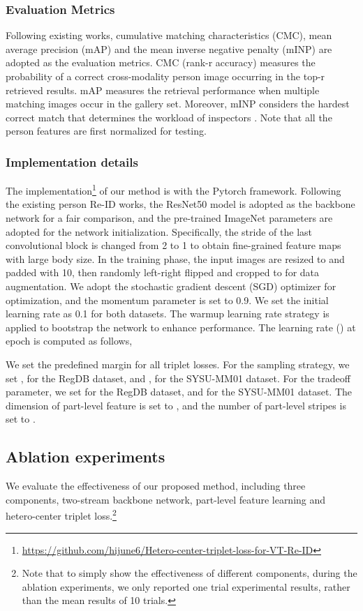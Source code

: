 \documentclass[journal]{IEEEtran}
\begin{document}
\subsubsection{Evaluation Metrics}
Following existing works, cumulative matching characteristics (CMC), mean average precision (mAP) and the mean inverse negative penalty (mINP) are adopted as the evaluation metrics. CMC (rank-r accuracy) measures the probability of a correct cross-modality person image occurring in the top-r retrieved results. mAP measures the retrieval performance when multiple matching images occur in the gallery set. Moreover, mINP considers the hardest correct match that determines the workload of inspectors \cite{Ye2020DeepLF}.
Note that all the person features are first  normalized for testing.

\subsubsection{Implementation details}
The implementation\footnote{\url{https://github.com/hijune6/Hetero-center-triplet-loss-for-VT-Re-ID}} of our method is with the Pytorch framework. Following the existing person Re-ID works, the ResNet50 model is adopted as the backbone network for a fair comparison, and the pre-trained ImageNet parameters are adopted for the network initialization. Specifically, the stride of the last convolutional block is changed from 2 to 1 to obtain fine-grained feature maps with large body size. In the training phase, the input images are resized to  and padded with 10, then randomly left-right flipped and cropped to  for data augmentation.
We adopt the stochastic gradient descent (SGD) optimizer for optimization, and the momentum parameter is set to 0.9. We set the initial learning rate as 0.1 for both datasets. The warmup learning rate strategy is applied to bootstrap the network to enhance performance. The learning rate () at epoch  is computed as follows,


We set the predefined margin  for all triplet losses.
For the  sampling strategy, we set ,  for the RegDB dataset, and ,  for the SYSU-MM01 dataset.
For the tradeoff parameter, we set  for the RegDB dataset, and  for the SYSU-MM01 dataset.
The dimension of part-level feature  is set to , and the number of part-level stripes  is set to .

\subsection{Ablation experiments}
\label{ssec:ablation}
We evaluate the effectiveness of our proposed method, including three components, two-stream backbone network, part-level feature learning and hetero-center triplet loss.\footnote{Note that to simply show the effectiveness of different components, during the ablation experiments, we only reported one trial experimental results, rather than the mean results of 10 trials.}
\end{document}
